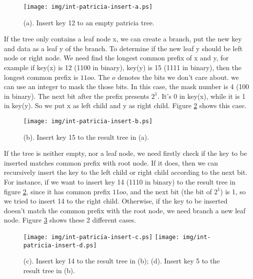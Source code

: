 \documentclass{article}
\begin{document}
\begin{figure}[htbp]
       \begin{center}
	\texttt{[image: img/int-patricia-insert-a.ps]}
        \caption{(a). Insert key 12 to an empty patricia tree.}
        \label{fig:int-patricia-insert-a}
       \end{center}
\end{figure}

If the tree only contains a leaf node x, we can create a branch, put the new
key and data as a leaf y of the branch. To determine if the new leaf y
should be left node or right node. We need find the longest common prefix
of x and y, for example if key(x) is 12 (1100 in binary), key(y) is 15
(1111 in binary), then the longest common prefix is $11oo$. The $o$
denotes the bits we don't care about. we can use an integer to mask
the those bits. In this case, the mask number is 4 (100 in binary).
The next bit after the prefix presents $2^1$. It's 0 in key(x), while
it is 1 in key(y). So we put x as left child and y as right
child. Figure \ref{fig:int-patricia-insert-b} shows this case.

\begin{figure}[htbp]
       \begin{center}
	\texttt{[image: img/int-patricia-insert-b.ps]}
        \caption{(b). Insert key 15 to the result tree in (a).}
        \label{fig:int-patricia-insert-b}
       \end{center}
\end{figure}

If the tree is neither empty, nor a leaf node, we need firstly check
if the key to be inserted matches common prefix with root node. If it
does, then we can recursively insert the key to the left child or right child
according to the next bit. For instance, if we want to
insert key 14 (1110 in binary) to the result tree in figure 
\ref{fig:int-patricia-insert-b}, since it has common prefix $11oo$,
and the next bit (the bit of $2^1$) is 1, so we tried to insert 14 to
the right child. Otherwise, if the key to be inserted doesn't match the
common prefix with the root node, we need branch a new leaf
node. Figure \ref{fig:int-patricia-insert-c} shows these 2 different cases.

\begin{figure}[htbp]
       \begin{center}
	\texttt{[image: img/int-patricia-insert-c.ps]}
	\texttt{[image: img/int-patricia-insert-d.ps]}
        \caption{(c). Insert key 14 to the result tree in (b);
	(d). Insert key 5 to the result tree in (b).}
        \label{fig:int-patricia-insert-c}
       \end{center}
\end{figure}
\end{document}
